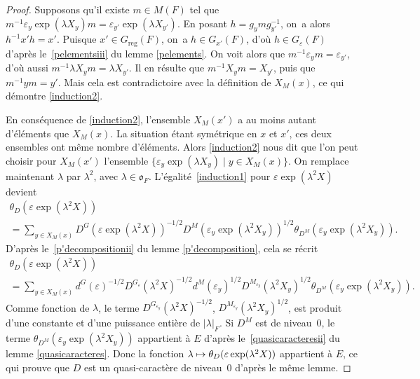 \documentclass[JEP,XML,SOM,Unicode,francais]{cedram}
\let\epsilon\varepsilon
\let\sep\mid
\newcommand\mto{\mathchoice{\longmapsto}{\mapsto}{\mapsto}{\mapsto}}
\newcommand{\fro}{\mathfrak{o}}
\newcommand{\reg}{\mathrm{reg}}
\theoremstyle{plain}
\theoremstyle{definition}
\begin{document}
\begin{proof}
Supposons qu'il existe $m\in M(F)$ tel que $m^{-1}\epsilon_{y}\exp(\lambda X_{y})m=\epsilon_{y'}\exp(\lambda X_{y'})$. En posant $h=g_{y}mg_{y'}^{-1}$, on~a alors $h^{-1}x'h=x'$. Puisque $x'\in G_{\reg}(F)$, on~a $h\in G_{x'}(F)$, d'où $h\in G_{\epsilon}(F)$ d'après le~\eqref{pelementsiii} du lemme \ref{pelements}. On voit alors que $m^{-1}\epsilon_{y}m=\epsilon_{y'}$, d'où aussi $m^{-1}\lambda X_{y}m=\lambda X_{y'}$. Il en résulte que $m^{-1}X_{y}m =X_{y'}$, puis que $m^{-1}ym=y'$. Mais cela est contradictoire avec la définition de $X_{M}(x)$, ce qui démontre \eqref{induction2}.

En conséquence de \eqref{induction2}, l'ensemble $X_{M}(x')$ a au moins autant d'éléments que $X_{M}(x)$. La situation étant symétrique en $x$ et $x'$, ces deux ensembles ont même nombre d'éléments. Alors \eqref{induction2} nous dit que l'on peut choisir pour $X_{M}(x')$ l'ensemble $\{\epsilon_{y}\exp(\lambda X_{y})\sep y\in X_{M}(x)\}$. On remplace maintenant $\lambda$ par $\lambda^2$, avec $\lambda\in \fro_{F}$. L'égalité~\eqref{induction1} pour $\epsilon \exp(\lambda^2X)$ devient\vspace*{-5pt}
\begin{multline*}
\theta_{D}(\epsilon \exp(\lambda^2X))\\[-3pt]
=\sum_{y\in X_{M}(x)}D^G(\epsilon \exp(\lambda^2X))^{-1/2}D^M(\epsilon_{y}\exp(\lambda^2X_{y}))^{1/2}\theta_{D^M}(\epsilon_{y}\exp(\lambda^2X_{y})).
\end{multline*}
D'après le~\eqref{p'decompositionii} du lemme \ref{p'decomposition}, cela se récrit\vspace*{-5pt}
\begin{multline*}
\theta_{D}(\epsilon \exp(\lambda^2X))\\[-3pt]
=\sum_{y\in X_{M}(x)}d^G(\epsilon)^{-1/2}D^{G_{\epsilon}}(\lambda^2X)^{-1/2} d^M(\epsilon_{y})^{1/2}D^{M_{\epsilon_{y}}}(\lambda^2X_{y})^{1/2}\theta_{D^M}(\epsilon_{y}\exp(\lambda^2X_{y})).
\end{multline*}
Comme fonction de $\lambda$, le terme $D^{G_{\epsilon_{y}}}(\lambda^2X)^{-1/2}$, \resp $D^{M_{\epsilon_{y}}}(\lambda^2X_{y})^{1/2}$, est produit d'une constante et d'une puissance entière de $\vert \lambda\vert _{F}$. Si $D^M$ est de niveau~$0$, le terme $ \theta_{D^M}(\epsilon_{y}\exp(\lambda^2X_{y}))$ appartient à $E$ d'après le~\eqref{quasicaracteresii} du lemme \ref{quasicaracteres}. Donc la fonction $\lambda\mto \theta_{D}(\epsilon \exp(\lambda^2X))$ appartient à $E$, ce qui prouve que $D$ est un quasi-caractère de niveau~$0$ d'après le même lemme.
\end{proof}
\end{document}

